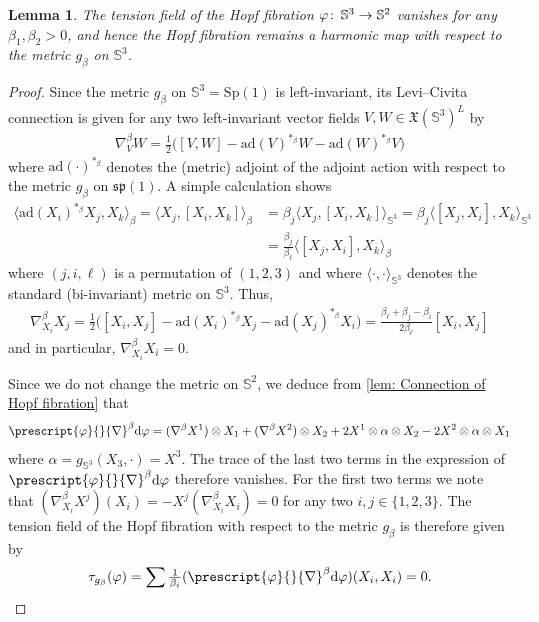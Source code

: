 \documentclass{article}
\numberwithin{equation}{section}        %
\theoremstyle{bfnote}
\newtheorem{lem}[thm]{Lemma}                %
\theoremstyle{definition}
\theoremstyle{bfremark}
\newcommand{\col}{\colon \thinspace}        %
\newcommand{\Sp}{\mathbb{S}}                %
\newcommand{\diff}{\mathrm{d}}                      %
\begin{document}
\begin{lem}     \label{lem: tension of Hopf fibration for deformed metric}
    The tension field of the Hopf fibration $\varphi \col \Sp^3 \to \Sp^2$ vanishes for any $\beta_1,\beta_2>0$, and hence the Hopf fibration remains a harmonic map with respect to the metric $g_\beta$ on $\Sp^3$.
\end{lem}

\begin{proof}
    Since the metric $g_\beta$ on $\Sp^3 = \mathrm{Sp}(1)$ is left-invariant, its Levi--Civita connection is given for any two left-invariant vector fields $V,W \in \mathfrak{X}(\Sp^3)^{L}$ by \begin{align*} \nabla^\beta_{V} W = \tfrac{1}{2}\big( [V,W] - \mathrm{ad}(V)^{*_\beta}W - \mathrm{ad}(W)^{*_\beta}V \big) \end{align*} where $\mathrm{ad}(\cdot)^{*_\beta}$ denotes the (metric) adjoint of the adjoint action with respect to the metric $g_\beta$ on $\mathfrak{sp}(1)$. A simple calculation shows
    \begin{align*}
        \langle\mathrm{ad}(X_i)^{*_\beta}X_j,X_k\rangle_\beta = \langle X_j , [X_i,X_k] \rangle_\beta &=  \beta_j \langle X_j, [X_i,X_k] \rangle_{\Sp^3} = \beta_j \langle [X_j,X_i],X_k \rangle_{\Sp^3} \\
    &= \tfrac{\beta_j}{\beta_\ell} \langle [X_j,X_i],X_k \rangle_\beta
    \end{align*}
    where $(j,i,\ell)$ is a permutation of $(1,2,3)$ and where $\langle \cdot,\cdot\rangle_{\Sp^3}$ denotes the standard (bi-invariant) metric on $\Sp^3$. Thus, 
    \begin{align*} 
        \nabla^\beta_{X_i} X_j = \tfrac{1}{2}\big( [X_i,X_j] - \mathrm{ad}(X_i)^{*_\beta}X_j - \mathrm{ad}(X_j)^{*_\beta}X_i \big) = \tfrac{\beta_\ell + \beta_j - \beta_i}{2\beta_{\ell}} [X_i,X_j] 
    \end{align*}
    and in particular, $\nabla^\beta_{X_i}X_i = 0$.

    Since we do not change the metric on $\Sp^2$, we deduce from \cref{lem: Connection of Hopf fibration} that 
    \begin{align*}
        \prescript{\varphi}{}{\nabla}^\beta \diff \varphi = (\nabla^\beta X^1) \otimes X_1 + (\nabla^{\beta} X^2) \otimes X_2 + 2 X^1 \otimes \alpha \otimes X_2 - 2 X^2 \otimes \alpha \otimes X_1
    \end{align*} 
    where $\alpha = g_{\Sp^3}(X_3,\cdot)=X^3$. The trace of the last two terms in the expression of $\prescript{\varphi}{}{\nabla}^\beta \diff \varphi$ therefore vanishes. For the first two terms we note that $(\nabla^\beta_{X_i} X^j)(X_i) = -X^j(\nabla^\beta_{X_i}X_i) = 0$ for any two $i,j \in \{1,2,3\}$. The tension field of the Hopf fibration with respect to the metric $g_\beta$ is therefore given by 
    \begin{equation*}
        \tau_{g_\beta}(\varphi) = \sum \tfrac{1}{\beta_i} (\prescript{\varphi}{}{\nabla}^\beta \diff \varphi) (X_i,X_i) = 0. \qedhere 
    \end{equation*}
\end{proof}
\end{document}
